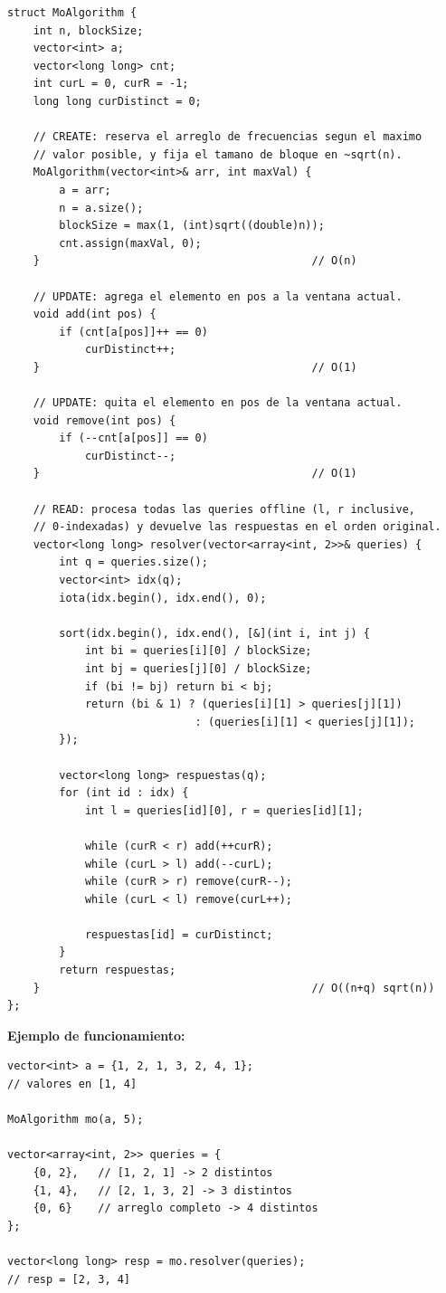\documentclass[10pt,a4paper,twocolumn]{article}
\begin{document}
\begin{lstlisting}[style=cpp]
struct MoAlgorithm {
    int n, blockSize;
    vector<int> a;
    vector<long long> cnt;
    int curL = 0, curR = -1;
    long long curDistinct = 0;

    // CREATE: reserva el arreglo de frecuencias segun el maximo
    // valor posible, y fija el tamano de bloque en ~sqrt(n).
    MoAlgorithm(vector<int>& arr, int maxVal) {
        a = arr;
        n = a.size();
        blockSize = max(1, (int)sqrt((double)n));
        cnt.assign(maxVal, 0);
    }                                          // O(n)

    // UPDATE: agrega el elemento en pos a la ventana actual.
    void add(int pos) {
        if (cnt[a[pos]]++ == 0)
            curDistinct++;
    }                                          // O(1)

    // UPDATE: quita el elemento en pos de la ventana actual.
    void remove(int pos) {
        if (--cnt[a[pos]] == 0)
            curDistinct--;
    }                                          // O(1)

    // READ: procesa todas las queries offline (l, r inclusive,
    // 0-indexadas) y devuelve las respuestas en el orden original.
    vector<long long> resolver(vector<array<int, 2>>& queries) {
        int q = queries.size();
        vector<int> idx(q);
        iota(idx.begin(), idx.end(), 0);

        sort(idx.begin(), idx.end(), [&](int i, int j) {
            int bi = queries[i][0] / blockSize;
            int bj = queries[j][0] / blockSize;
            if (bi != bj) return bi < bj;
            return (bi & 1) ? (queries[i][1] > queries[j][1])
                             : (queries[i][1] < queries[j][1]);
        });

        vector<long long> respuestas(q);
        for (int id : idx) {
            int l = queries[id][0], r = queries[id][1];

            while (curR < r) add(++curR);
            while (curL > l) add(--curL);
            while (curR > r) remove(curR--);
            while (curL < l) remove(curL++);

            respuestas[id] = curDistinct;
        }
        return respuestas;
    }                                          // O((n+q) sqrt(n))
};
\end{lstlisting}

\textbf{Ejemplo de funcionamiento:}

\begin{lstlisting}[style=cpp]
vector<int> a = {1, 2, 1, 3, 2, 4, 1};
// valores en [1, 4]

MoAlgorithm mo(a, 5);

vector<array<int, 2>> queries = {
    {0, 2},   // [1, 2, 1] -> 2 distintos
    {1, 4},   // [2, 1, 3, 2] -> 3 distintos
    {0, 6}    // arreglo completo -> 4 distintos
};

vector<long long> resp = mo.resolver(queries);
// resp = [2, 3, 4]
\end{lstlisting}
\end{document}

